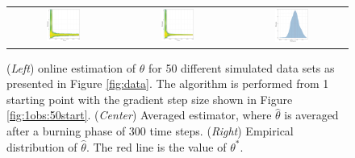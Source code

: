 \documentclass{article}
\newcommand{\parvec}{\theta}
\begin{document}
\begin{figure}
\centering
\begin{tabular}{ccc}
\includegraphics[width = 0.32\textwidth]{severalObs_oneStart.pdf}&
\includegraphics[width = 0.32\textwidth]{severalObs_oneStart_smooth.pdf}&
\includegraphics[width = 0.32\textwidth]{severalObs_oneStart_smooth_dens.pdf}
\end{tabular}
\caption{\label{fig:50obs:1start}(\textit{Left}) online estimation of $\parvec$ for 50 different simulated data sets as presented in Figure \ref{fig:data}. The algorithm is performed from 1 starting point with the gradient step size shown in Figure \ref{fig:1obs:50start}. (\textit{Center}) Averaged estimator, where $\hat{\parvec}$ is averaged after a burning phase of 300 time steps. (\textit{Right}) Empirical distribution of $\hat{\parvec}$. The red line is the value of $\parvec^*$.}
\end{figure}
\end{document}
